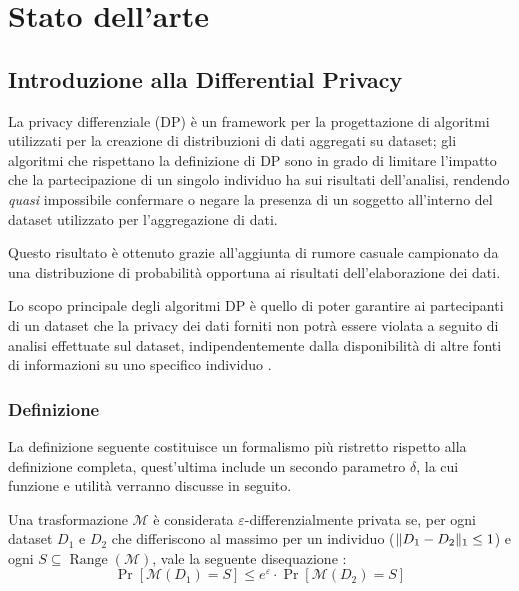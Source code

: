\chapter{Stato dell'arte}
\section{Introduzione alla Differential Privacy}
La privacy differenziale (DP) è un framework per la progettazione di algoritmi utilizzati per la creazione di distribuzioni di dati aggregati su dataset; gli algoritmi che rispettano la definizione di DP sono in grado di limitare l'impatto che la partecipazione di un singolo individuo ha sui risultati dell'analisi, rendendo \textit{quasi} impossibile confermare o negare la presenza di un soggetto all'interno del dataset utilizzato per l'aggregazione di dati.


Questo risultato è ottenuto grazie all'aggiunta di rumore casuale campionato da una distribuzione di probabilità opportuna ai risultati dell'elaborazione dei dati.

Lo scopo principale degli algoritmi DP è quello di poter garantire ai partecipanti di un dataset che la privacy dei dati forniti non potrà essere violata a seguito di analisi effettuate sul dataset, indipendentemente dalla disponibilità di altre fonti di informazioni su uno specifico individuo \cite[p.~5]{TCS-042}.

\subsection{Definizione}
La definizione seguente costituisce un formalismo più ristretto rispetto alla definizione completa, quest'ultima include un secondo parametro $\mathcal{\delta}$, la cui funzione e utilità verranno discusse in seguito.

Una trasformazione $\mathcal{M}$ è considerata $\varepsilon$-differenzialmente privata se, per ogni dataset $D_1$ e $D_2$ che differiscono al massimo per un individuo ($\lVert D_1 - D_2\rVert_1 \le 1$) e ogni $S \subseteq \operatorname{Range}(\mathcal{M})$, vale la seguente disequazione \cite{10.1007/11681878_14}:
\begin{equation}
  \Pr[\mathcal{M}(D_1) = S] \le e^{\varepsilon} \cdot \Pr[\mathcal{M}(D_2) = S]
  \label{eq:e_differential_privacy}
\end{equation}

